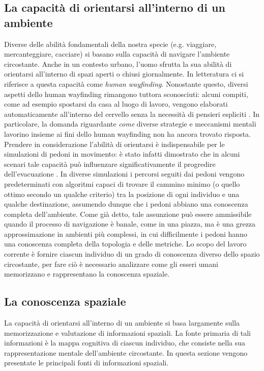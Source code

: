 \documentclass[12pt,a4paper,openright,oneside]{book}
\begin{document}
\subsection{La capacità di orientarsi all'interno di un ambiente}
Diverse delle abilità fondamentali della nostra specie (e.g. viaggiare, mercanteggiare, cacciare) si basano sulla capacità di navigare l’ambiente circostante. Anche in un contesto urbano, l’uomo sfrutta la sua abilità di orientarsi all’interno di spazi aperti o chiusi giornalmente. In letteratura ci si riferisce a questa capacità come \emph{human wayfinding}. Nonostante questo, diversi aspetti dello human wayfinding rimangono tuttora sconosciuti: alcuni compiti, come ad esempio spostarsi da casa al luogo di lavoro, vengono elaborati automaticamente all'interno del cervello senza la necessità di pensieri espliciti \cite{MontelloWayfinding2006}. In particolare, la domanda riguardante \emph{come} diverse strategie e meccanismi mentali lavorino insieme ai fini dello human wayfinding non ha ancora trovato risposta.
Prendere in considerazione l’abilità di orientarsi è indispensabile per le simulazioni di pedoni in movimento: è stato infatti dimostrato che in alcuni scenari tale capacità può influenzare significativamente il progredire dell’evacuazione \cite{AndresenWayfinding2016}. In diverse simulazioni i percorsi seguiti dai pedoni vengono predeterminati con algoritmi capaci di trovare il cammino minimo (o quello ottimo secondo un qualche criterio) tra la posizione di ogni individuo e una qualche destinazione, assumendo dunque che i pedoni abbiano una conoscenza completa dell’ambiente. Come già detto, tale assunzione può essere ammissibile quando il processo di navigazione è banale, come in una piazza, ma è una grezza approssimazione in ambienti più complessi, in cui difficilmente i pedoni hanno una conoscenza completa della topologia e delle metriche. Lo scopo del lavoro corrente è fornire ciascun individuo di un grado di conoscenza diverso dello spazio circostante, per fare ciò è necessario analizzare come gli esseri umani memorizzano e rappresentano la conoscenza spaziale.

\subsection{La conoscenza spaziale}
\label{spatial-knowledge}
La capacità di orientarsi all’interno di un ambiente si basa largamente sulla memorizzazione e valutazione di informazioni spaziali. La fonte primaria di tali informazioni è la mappa cognitiva di ciascun individuo, che consiste nella sua rappresentazione mentale dell’ambiente circostante. In questa sezione vengono presentate le principali fonti di informazioni spaziali.
\end{document}
